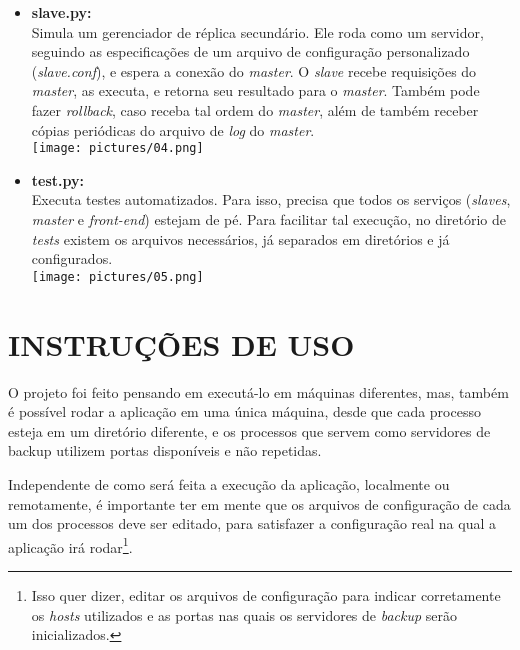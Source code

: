 \documentclass[12pt,a4paper]{article}
\begin{document}
\begin{itemize}
			\item \textbf{slave.py:}\\Simula um gerenciador de réplica secundário. Ele roda como um servidor, seguindo as especificações de um arquivo de configuração personalizado (\textit{slave.conf}), e espera a conexão do \textit{master}. O \textit{slave} recebe requisições do \textit{master}, as executa, e retorna seu resultado para o \textit{master}. Também pode fazer \textit{rollback}, caso receba tal ordem do \textit{master}, além de também receber cópias periódicas do arquivo de \textit{log} do \textit{master}.\\
				\texttt{[image: pictures/04.png]}
			
			\item \textbf{test.py:}\\Executa testes automatizados. Para isso, precisa que todos os serviços (\textit{slaves}, \textit{master} e \textit{front-end}) estejam de pé. Para facilitar tal execução, no diretório de \textit{tests} existem os arquivos necessários, já separados em diretórios e já configurados.\\
			\texttt{[image: pictures/05.png]}
		\end{itemize}
	
	\section{\normalsize INSTRUÇÕES DE USO}
		O projeto foi feito pensando em executá-lo em máquinas diferentes, mas, também é possível rodar a aplicação em uma única máquina, desde que cada processo esteja em um diretório diferente, e os processos que servem como servidores de backup utilizem portas disponíveis e não repetidas.
		
		Independente de como será feita a execução da aplicação, localmente ou remotamente, é importante ter em mente que os arquivos de configuração de cada um dos processos deve ser editado, para satisfazer a configuração real na qual a aplicação irá rodar\footnote{Isso quer dizer, editar os arquivos de configuração para indicar corretamente os \textit{hosts} utilizados e as portas nas quais os servidores de \textit{backup} serão inicializados.}.
	
\end{document}
